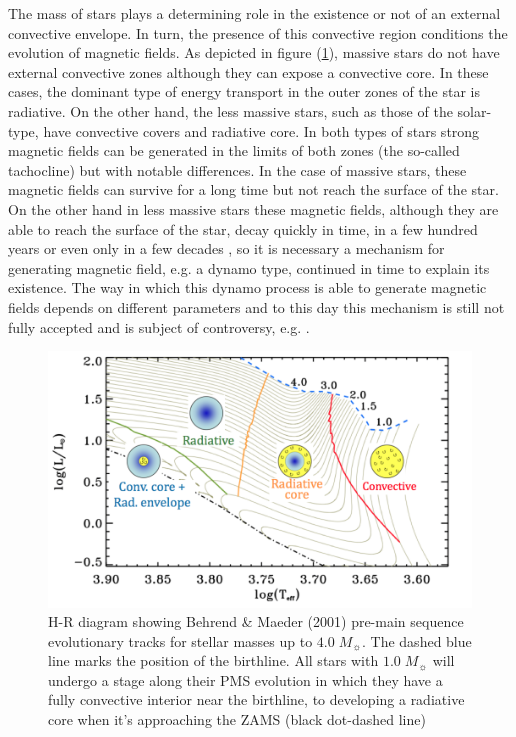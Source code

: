 \documentclass[fleqn,usenatbib]{mnras}
\begin{document}
The mass of stars plays a determining role in the existence or not of an external convective envelope. In turn, the presence of this convective region conditions the evolution of magnetic fields. As depicted in figure (\ref{fig:hr_hussain}), massive stars do not have external convective zones although they can expose a convective core. In these cases, the dominant type of energy transport in the outer zones of the star is radiative. On the other hand, the less massive stars, such as those of the solar-type, have convective covers and radiative core. In both types of stars strong magnetic fields can be generated in the limits of both zones (the so-called tachocline) but with notable differences. In the case of massive stars, these magnetic fields can survive for a long time but not reach the surface of the star. On the other hand in less massive stars these magnetic fields, although they are able to reach the surface of the star, decay quickly in time, in a few hundred years or even only in a few decades \citep{Chabrier2006}, so it is necessary a mechanism for generating magnetic field, e.g. a dynamo type, continued in time to explain its existence. The way in which this dynamo process is able to generate magnetic fields depends on different parameters and to this day this mechanism is still not fully accepted and is subject of controversy, e.g. \citep{Charbonneau2010}.\par

\begin{figure}
	\includegraphics[width=\columnwidth]{figures/hussain_gaitee_fig1.png}
    \caption{H-R diagram showing Behrend \& Maeder (2001) pre-main sequence evolutionary tracks for stellar masses up to $4.0 \; M_{\sun}$. The dashed blue line marks the position of the birthline. All stars with $1.0 \; M_{\sun}$ will undergo a stage along their PMS evolution in which they have a fully convective interior near the birthline, to developing a radiative core when it's approaching the ZAMS (black dot-dashed line) \citet{Hussain2014}}
    \label{fig:hr_hussain}
\end{figure}
\end{document}
